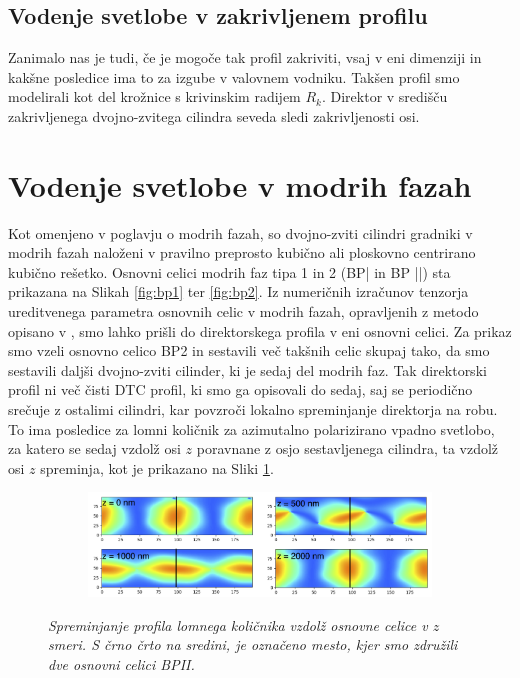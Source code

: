 \documentclass[longbibliography,slovene,a4paper,12pt]{book}
\begin{document}
\subsection{Vodenje svetlobe v zakrivljenem profilu}

Zanimalo nas je tudi, če je mogoče tak profil zakriviti, vsaj v eni dimenziji in kakšne posledice ima to za izgube v valovnem vodniku. Takšen profil smo modelirali kot del krožnice s krivinskim radijem $R_k$. Direktor v središču zakrivljenega dvojno-zvitega cilindra seveda sledi zakrivljenosti osi.

\section{Vodenje svetlobe v modrih fazah}

Kot omenjeno v poglavju o modrih fazah, so dvojno-zviti cilindri gradniki v modrih fazah naloženi v pravilno preprosto kubično ali ploskovno centrirano kubično rešetko. Osnovni celici modrih faz tipa 1 in 2 (BP| in BP ||) sta prikazana na Slikah \ref{fig:bp1} ter \ref{fig:bp2}. Iz numeričnih izračunov tenzorja ureditvenega parametra osnovnih celic v modrih fazah, opravljenih z metodo opisano v \cite{ravnik,ravnik3}, smo lahko prišli do direktorskega profila v eni osnovni celici. Za prikaz smo vzeli osnovno celico BP2 in sestavili več takšnih celic skupaj tako, da smo sestavili daljši dvojno-zviti cilinder, ki je sedaj del modrih faz. Tak direktorski profil ni več čisti DTC profil, ki smo ga opisovali do sedaj, saj se periodično srečuje z ostalimi cilindri, kar povzroči lokalno spreminjanje direktorja na robu. To ima posledice za lomni količnik za azimutalno polarizirano vpadno svetlobo, za katero se sedaj vzdolž osi $z$ poravnane z osjo sestavljenega cilindra, ta vzdolž osi $z$ spreminja, kot je prikazano na Sliki \ref{fig:bluephaseindex}.
\begin{figure}[h!]
	\centering
	\begin{subfigure}[b]{0.9\textwidth}
	\includegraphics[width=\textwidth]{slike/bp_n.png}
	\end{subfigure}
	\label{fig:bluephaseindex}
	\caption{\emph{Spreminjanje profila lomnega količnika vzdolž osnovne celice v $z$ smeri. S črno črto na sredini, je označeno mesto, kjer smo združili dve osnovni celici BPII.}}
\end{figure}
 
\end{document}
